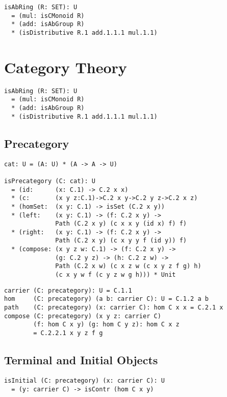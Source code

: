 \documentclass{article}
\begin{document}
\begin{lstlisting}[mathescape=true]
isAbRing (R: SET): U
  = (mul: isCMonoid R)
  * (add: isAbGroup R)
  * (isDistributive R.1 add.1.1.1 mul.1.1)
\end{lstlisting}

\newpage
\section{Category Theory}

\begin{lstlisting}[mathescape=true]
isAbRing (R: SET): U
  = (mul: isCMonoid R)
  * (add: isAbGroup R)
  * (isDistributive R.1 add.1.1.1 mul.1.1)
\end{lstlisting}

\subsection{Precategory}

\begin{lstlisting}[mathescape=true]
cat: U = (A: U) * (A -> A -> U)

isPrecategory (C: cat): U
  = (id:      (x: C.1) -> C.2 x x)
  * (c:       (x y z:C.1)->C.2 x y->C.2 y z->C.2 x z)
  * (homSet:  (x y: C.1) -> isSet (C.2 x y))
  * (left:    (x y: C.1) -> (f: C.2 x y) ->
              Path (C.2 x y) (c x x y (id x) f) f)
  * (right:   (x y: C.1) -> (f: C.2 x y) ->
              Path (C.2 x y) (c x y y f (id y)) f)
  * (compose: (x y z w: C.1) -> (f: C.2 x y) ->
              (g: C.2 y z) -> (h: C.2 z w) ->
              Path (C.2 x w) (c x z w (c x y z f g) h)
              (c x y w f (c y z w g h))) * Unit
\end{lstlisting}

\begin{lstlisting}[mathescape=true]
carrier (C: precategory): U = C.1.1
hom     (C: precategory) (a b: carrier C): U = C.1.2 a b
path    (C: precategory) (x: carrier C): hom C x x = C.2.1 x
compose (C: precategory) (x y z: carrier C)
        (f: hom C x y) (g: hom C y z): hom C x z
        = C.2.2.1 x y z f g
\end{lstlisting}

\subsection{Terminal and Initial Objects}

\begin{lstlisting}[mathescape=true]
isInitial (C: precategory) (x: carrier C): U
  = (y: carrier C) -> isContr (hom C x y)
\end{lstlisting}
\end{document}
